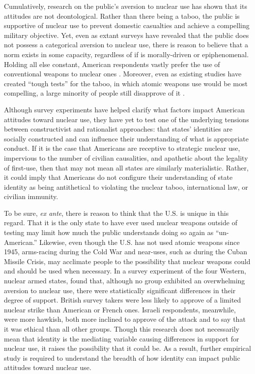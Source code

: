 \documentclass[12pt]{article}
\begin{document}
Cumulatively, research on the public's aversion to nuclear use has shown that its attitudes are not deontological. Rather than there being a taboo, the public is supportive of nuclear use to prevent domestic casualties and achieve a compelling military objective. Yet, even as extant surveys have revealed that the public does not possess a categorical aversion to nuclear use, there is reason to believe that a norm exists in some capacity, regardless of if is morally-driven or epiphenomenal. Holding all else constant, American respondents vastly prefer the use of conventional weapons to nuclear ones \citep{press_atomic_2013}. Moreover, even as existing studies have created “tough tests” for the taboo, in which atomic weapons use would be most compelling, a large minority of people still disapprove of it \citep{sagan_revisiting_2017}.

Although survey experiments have helped clarify what factors impact American attitudes toward nuclear use, they have yet to test one of the underlying tensions between constructivist and rationalist approaches: that states' identities are socially constructed and can influence their understanding of what is appropriate conduct. If it is the case that Americans are receptive to strategic nuclear use, impervious to the number of civilian causalities, and apathetic about the legality of first-use, then that may not mean all states are similarly materialistic. Rather, it could imply that Americans do not configure their understanding of state identity as being antithetical to violating the nuclear taboo, international law, or civilian immunity.

To be sure, \textit{ex ante}, there is reason to think that the U.S. is unique in this regard. That it is the only state to have ever used nuclear weapons outside of testing may limit how much the public understands doing so again as “un-American.” Likewise, even though the U.S. has not used atomic weapons since 1945, arms-racing during the Cold War and near-uses, such as during the Cuban Missile Crisis, may acclimate people to the possibility that nuclear weapons could and should be used when necessary. In a survey experiment of the four Western, nuclear armed states, \citet{dill_kettles_2022} found that, although no group exhibited an overwhelming aversion to nuclear use, there were statistically significant differences in their degree of support. British survey takers were less likely to approve of a limited nuclear strike than American or French ones. Israeli respondents, meanwhile, were more hawkish, both more inclined to approve of the attack and to say that it was ethical than all other groups. Though this research does not necessarily mean that identity is the mediating variable causing differences in support for nuclear use, it raises the possibility that it could be. As a result, further empirical study is required to understand the breadth of how identity can impact public attitudes toward nuclear use.
\end{document}
